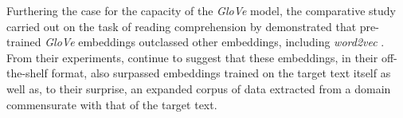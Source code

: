 \documentclass[../../fyp.tex]{subfiles}
\begin{document}
Furthering the case for the capacity of the \textit{GloVe} model, the comparative study carried out on the task of reading comprehension by \citet{bhuwandhingra2017} demonstrated that pre-trained \textit{GloVe} embeddings outclassed other embeddings, including \textit{word2vec} \cite{mikolov2013}. From their experiments, \citet{bhuwandhingra2017} continue to suggest that these embeddings, in their off-the-shelf format, also surpassed embeddings trained on the target text itself as well as, to their surprise, an expanded corpus of data extracted from a domain commensurate with that of the target text.





\end{document}
